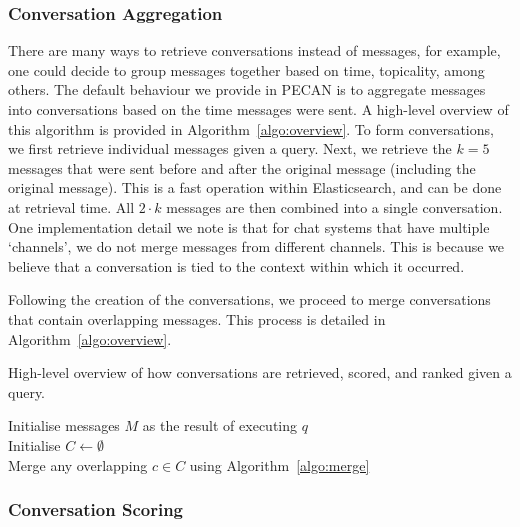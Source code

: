 \subsubsection{Conversation Aggregation}
\label{sec:conv-agg}

There are many ways to retrieve conversations instead of messages, for example, one could decide to group messages together based on time, topicality, among others. The default behaviour we provide in PECAN is to aggregate messages into conversations based on the time messages were sent. A high-level overview of this algorithm is provided in Algorithm~\ref{algo:overview}. To form conversations, we first retrieve individual messages given a query. Next, we retrieve the $k=5$ messages that were sent before and after the original message (including the original message). This is a fast operation within Elasticsearch, and can be done at retrieval time. All $2 \cdot k$ messages are then combined into a single conversation. One implementation detail we note is that for chat systems that have multiple `channels', we do not merge messages from different channels. This is because we believe that a conversation is tied to the context within which it occurred.

Following the creation of the conversations, we proceed to merge conversations that contain overlapping messages. This process is detailed in Algorithm~\ref{algo:overview}.



\begin{algorithm}[t!]
	\SetAlgoLined
	\caption{High-level overview of how conversations are retrieved, scored, and ranked given a query.}
	\label{algo:overview}
	Initialise messages $M$ as the result of executing $q$\\
	Initialise $C\gets\emptyset$\\ 
    Merge any overlapping $c\in C$ using Algorithm~\ref{algo:merge}\\
	\end{algorithm}
		
	
		
\subsubsection{Conversation Scoring}
\label{sec:conv-scoring}

